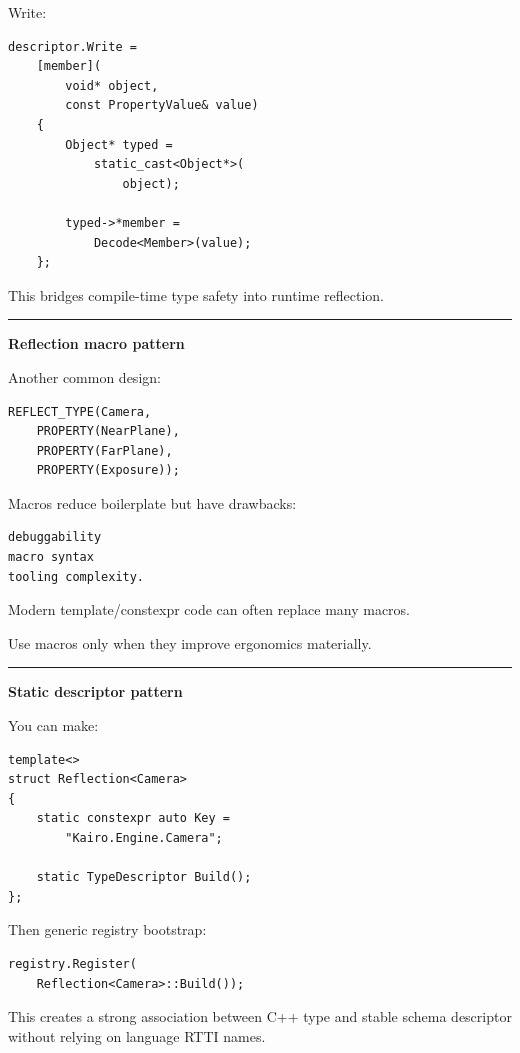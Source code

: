 Write:

\begin{verbatim}
descriptor.Write =
    [member](
        void* object,
        const PropertyValue& value)
    {
        Object* typed =
            static_cast<Object*>(
                object);

        typed->*member =
            Decode<Member>(value);
    };
\end{verbatim}

This bridges compile-time type safety into runtime reflection.

\begin{center}\rule{0.5\linewidth}{0.5pt}\end{center}

\textbf{Reflection macro pattern}

Another common design:

\begin{verbatim}
REFLECT_TYPE(Camera,
    PROPERTY(NearPlane),
    PROPERTY(FarPlane),
    PROPERTY(Exposure));
\end{verbatim}

Macros reduce boilerplate but have drawbacks:

\begin{verbatim}
debuggability
macro syntax
tooling complexity.
\end{verbatim}

Modern template/constexpr code can often replace many macros.

Use macros only when they improve ergonomics materially.

\begin{center}\rule{0.5\linewidth}{0.5pt}\end{center}

\textbf{Static descriptor pattern}

You can make:

\begin{verbatim}
template<>
struct Reflection<Camera>
{
    static constexpr auto Key =
        "Kairo.Engine.Camera";

    static TypeDescriptor Build();
};
\end{verbatim}

Then generic registry bootstrap:

\begin{verbatim}
registry.Register(
    Reflection<Camera>::Build());
\end{verbatim}

This creates a strong association between C++ type and stable schema descriptor without relying on language RTTI names.

